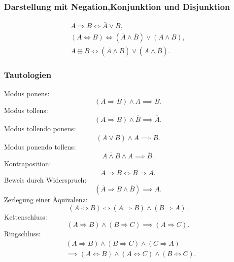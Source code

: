 \subsubsection[Darstellung mit Negation, Konjunktion und Disjunktion]%
{Darstellung mit Negation,\newline Konjunktion und Disjunktion}
\begin{gather}\label{eq:implication-definition}
A\Rightarrow B \iff \overline A\lor B,\\
(A\Leftrightarrow B) \iff
  (\overline A\land\overline B)\lor(A\land B),\\
A\oplus B \iff (\overline A\land B)\lor(A\land\overline B).
\end{gather}

\newpage
\subsubsection{Tautologien}
Modus ponens:
\begin{equation}\label{eq:modus-ponens}
(A\Rightarrow B)\land A\implies B.
\end{equation}
Modus tollens:
\begin{equation}
(A\Rightarrow B)\land\overline B\implies\overline A.
\end{equation}
Modus tollendo ponens:
\begin{equation}
(A\lor B)\land\overline A \implies B.
\end{equation}
Modus ponendo tollens:
\begin{equation}
\overline{A\land B}\land A\implies\overline B.
\end{equation}
Kontraposition:
\begin{equation}
A\Rightarrow B \iff \overline B\Rightarrow \overline A.
\end{equation}
Beweis durch Widerspruch:
\begin{equation}
(\overline A\Rightarrow B\land\overline B)\implies A.
\end{equation}
Zerlegung einer Äquivalenz:
\begin{equation}
(A\Leftrightarrow B) \iff (A\Rightarrow B)\land(B\Rightarrow A).
\end{equation}
Kettenschluss:
\begin{equation}
(A\Rightarrow B)\land(B\Rightarrow C)\implies (A\Rightarrow C).
\end{equation}
Ringschluss:
\begin{equation}
\begin{split}
&(A\Rightarrow B)\land (B\Rightarrow C)\land(C\Rightarrow A)\\
&\implies (A\Leftrightarrow B)\land(A\Leftrightarrow C)\land(B\Leftrightarrow C).
\end{split}
\end{equation}
